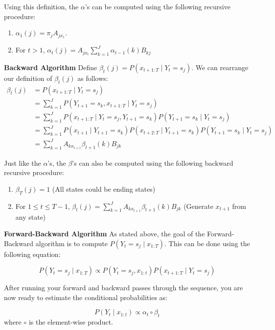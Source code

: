 \documentclass[11pt,addpoints,answers]{exam}
\begin{document}
Using this definition, the $\alpha$'s can be computed using the following recursive procedure:
\begin{enumerate}
    \item $\alpha_1(j)=\pi_jA_{jx_1}$. 
    \item For $t > 1$, $\alpha_{t}(j)=A_{jx_{t}}\sum_{k=1}^{J}\alpha_{t-1}(k)B_{kj}$ 
\end{enumerate}

\clearpage

\textbf{Backward Algorithm}
Define $\beta_t(j) = P(x_{t+1:T} \mid Y_t=s_j)$. We can rearrange our definition of $\beta_t(j)$ as follows:
\begin{align}
    \label{eqn:beta}
    \beta_t(j) &= P(x_{t+1:T} \mid Y_t=s_j)\nonumber\\
    &= \sum_{k=1}^JP(Y_{t+1}=s_k,x_{t+1:T} \mid Y_t=s_j)\nonumber\\
    &= \sum_{k=1}^JP(x_{t+1:T} \mid Y_t=s_j,Y_{t+1}=s_k)P(Y_{t+1}=s_k \mid Y_t=s_j)\nonumber\\
    &= \sum_{k=1}^JP(x_{t+1} \mid Y_{t+1}=s_k)P(x_{t+2:T} \mid Y_{t+1}=s_k)P(Y_{t+1}=s_k \mid Y_t=s_j)\nonumber\\
    &= \sum_{k=1}^J A_{kx_{t+1}}\beta_{t+1}(k)B_{jk}
\end{align}


Just like the $\alpha$'s, the $\beta$'s can also be computed using the following backward recursive procedure:

\begin{enumerate}
    \item $\beta_T(j) = 1$ (All states could be ending states)
    \item  For $1\leq t \leq T-1$, $\beta_t(j) = \sum_{k=1}^{J}A_{kx_{t+1}}\beta_{t+1}(k)B_{jk}$ (Generate $x_{t+1}$ from any state)
\end{enumerate}

\vspace{0.4 in}
\textbf{Forward-Backward Algorithm}
As stated above, the goal of the Forward-Backward algorithm is to compute $P(Y_t =s_j \mid x_{1:T})$. This can be done using the following equation:

$$P(Y_t =s_j \mid x_{1:T}) \propto P(Y_t=s_j, x_{1:t})P(x_{t+1:T} \mid Y_t=s_j) $$

After running your forward and backward passes through the sequence, you are now ready to estimate the conditional probabilities as:

$$P(Y_t \mid x_{1:t}) \propto \alpha_t\circ\beta_t$$
where $\circ$ is the element-wise product.
\end{document}
